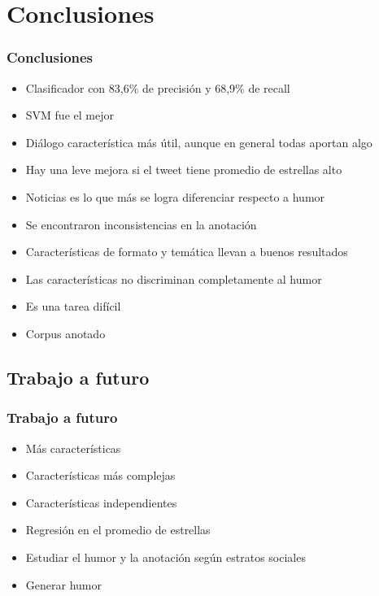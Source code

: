 \section{Conclusiones}

\begin{frame}
    \frametitle{Conclusiones}
    
    \begin{itemize}
    	\item[\checkmark] Clasificador con 83,6\% de precisión y 68,9\% de recall
    	\item[\checkmark] SVM fue el mejor
    	\item[\checkmark] Diálogo característica más útil, aunque en general todas aportan algo
    	\item[\checkmark] Hay una leve mejora si el tweet tiene promedio de estrellas alto
    	\item[\checkmark] Noticias es lo que más se logra diferenciar respecto a humor
    	\item[\checkmark] Se encontraron inconsistencias en la anotación
        \item[\checkmark] Características de formato y temática llevan a buenos resultados
    	\item[\checkmark] Las características no discriminan completamente al humor
    	\item[\checkmark] Es una tarea difícil
        \item[\checkmark] Corpus anotado
    \end{itemize}
\end{frame}

\subsection{Trabajo a futuro}
\begin{frame}
    \frametitle{Trabajo a futuro}
    
    \begin{itemize}
        \item Más características
    	\item Características más complejas
    	\item Características independientes
    	\item Regresión en el promedio de estrellas
    	\item Estudiar el humor y la anotación según estratos sociales
        \item Generar humor
    \end{itemize}
\end{frame}
